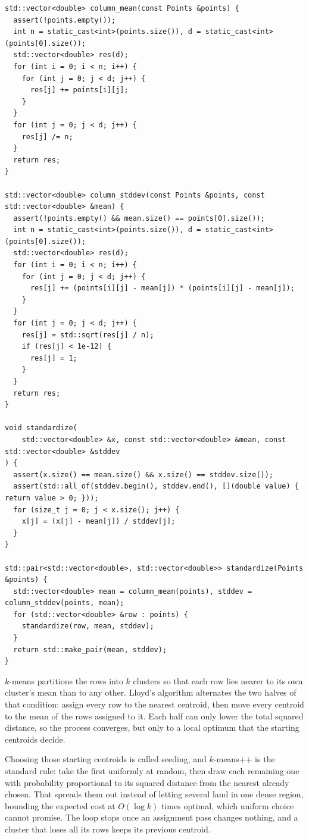 \begin{lstlisting}[style=cpp]
std::vector<double> column_mean(const Points &points) {
  assert(!points.empty());
  int n = static_cast<int>(points.size()), d = static_cast<int>(points[0].size());
  std::vector<double> res(d);
  for (int i = 0; i < n; i++) {
    for (int j = 0; j < d; j++) {
      res[j] += points[i][j];
    }
  }
  for (int j = 0; j < d; j++) {
    res[j] /= n;
  }
  return res;
}

std::vector<double> column_stddev(const Points &points, const std::vector<double> &mean) {
  assert(!points.empty() && mean.size() == points[0].size());
  int n = static_cast<int>(points.size()), d = static_cast<int>(points[0].size());
  std::vector<double> res(d);
  for (int i = 0; i < n; i++) {
    for (int j = 0; j < d; j++) {
      res[j] += (points[i][j] - mean[j]) * (points[i][j] - mean[j]);
    }
  }
  for (int j = 0; j < d; j++) {
    res[j] = std::sqrt(res[j] / n);
    if (res[j] < 1e-12) {
      res[j] = 1;
    }
  }
  return res;
}

void standardize(
    std::vector<double> &x, const std::vector<double> &mean, const std::vector<double> &stddev
) {
  assert(x.size() == mean.size() && x.size() == stddev.size());
  assert(std::all_of(stddev.begin(), stddev.end(), [](double value) { return value > 0; }));
  for (size_t j = 0; j < x.size(); j++) {
    x[j] = (x[j] - mean[j]) / stddev[j];
  }
}

std::pair<std::vector<double>, std::vector<double>> standardize(Points &points) {
  std::vector<double> mean = column_mean(points), stddev = column_stddev(points, mean);
  for (std::vector<double> &row : points) {
    standardize(row, mean, stddev);
  }
  return std::make_pair(mean, stddev);
}
\end{lstlisting}
$k$-means partitions the rows into $k$ clusters so that each row lies nearer to its own cluster's mean than to any other. Lloyd's algorithm alternates the two halves of that condition: assign every row to the nearest centroid, then move every centroid to the mean of the rows assigned to it. Each half can only lower the total squared distance, so the process converges, but only to a local optimum that the starting centroids decide.

Choosing those starting centroids is called seeding, and $k$-means++ is the standard rule: take the first uniformly at random, then draw each remaining one with probability proportional to its squared distance from the nearest already chosen. That spreads them out instead of letting several land in one dense region, bounding the expected cost at $O(\log k)$ times optimal, which uniform choice cannot promise. The loop stops once an assignment pass changes nothing, and a cluster that loses all its rows keeps its previous centroid.


